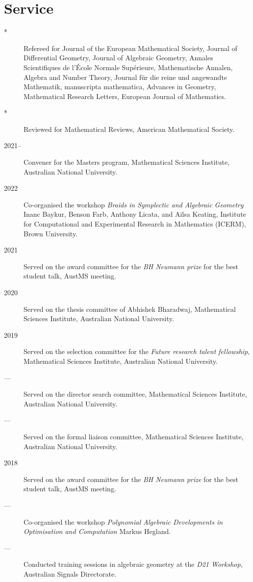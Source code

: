 \documentclass[11pt]{article}
\begin{document}
\section*{Service}
\label{sec:org30bcbb7}
\begin{description}
\item[{*}] Refereed for Journal of the European Mathematical Society, Journal of Differential Geometry, Journal of Algebraic Geometry, Annales Scientifiques de l'École Normale Supérieure, Mathematische Annalen, Algebra and Number Theory, Journal für die reine und angewandte Mathematik, manuscripta mathematica, Advances in Geometry, Mathematical Research Letters, European Journal of Mathematics.
\item[{*}] Reviewed for Mathematical Reviews, American Mathematical Society.
\item[{2021--}] Convener for the Masters program, Mathematical Sciences Institute, Australian National University.
\item[{2022}] Co-organised the workshop \emph{Braids in Symplectic and Algebraic Geometry} Inanc Baykur, Benson Farb, Anthony Licata, and Ailsa Keating, Institute for Computational and Experimental Research in Mathematics (ICERM), Brown University.
\item[{2021}] Served on the award committee for the \emph{BH Neumann prize} for the best student talk, AustMS meeting.
\item[{2020}] Served on the thesis committee of Abhishek Bharadwaj, Mathematical Sciences Institute, Australian National University.
\item[{2019}] Served on the selection committee for the \emph{Future research talent fellowship}, Mathematical Sciences Institute, Australian National University.
\item[{---}] Served on the director search committee, Mathematical Sciences Institute, Australian National University.
\item[{---}] Served on the formal liaison committee, Mathematical Sciences Institute, Australian National University.
\item[{2018}] Served on the award committee for the \emph{BH Neumann prize} for the best student talk, AustMS meeting.
\item[{---}] Co-organised the workshop \emph{Polynomial Algebraic Developments in Optimisation and Computation} Markus Hegland.
\item[{---}] Conducted training sessions in algebraic geometry at the \emph{D21 Workshop}, Australian Signals Directorate.

\end{description}
\end{document}
